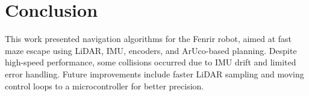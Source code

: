\section{Conclusion}
This work presented navigation algorithms for the Fenrir robot, aimed at fast maze escape using LiDAR, IMU, encoders, and ArUco-based planning. Despite high-speed performance, some collisions occurred due to IMU drift and limited error handling. Future improvements include faster LiDAR sampling and moving control loops to a microcontroller for better precision.